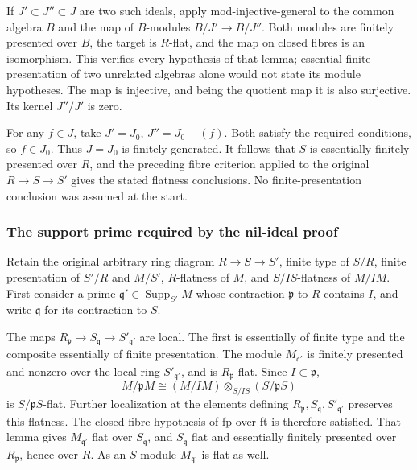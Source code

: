 If \(J'\subset J''\subset J\) are two such ideals, apply mod-injective-general to the common algebra \(B\) and the map of \(B\)-modules \(B/J'\to B/J''\). Both modules are finitely presented over \(B\), the target is \(R\)-flat, and the map on closed fibres is an isomorphism. This verifies every hypothesis of that lemma; essential finite presentation of two unrelated algebras alone would not state its module hypotheses. The map is injective, and being the quotient map it is also surjective. Its kernel \(J''/J'\) is zero.

For any \(f\in J\), take \(J'=J_0\), \(J''=J_0+(f)\). Both satisfy the required conditions, so \(f\in J_0\). Thus \(J=J_0\) is finitely generated. It follows that \(S\) is essentially finitely presented over \(R\), and the preceding fibre criterion applied to the original \(R\to S\to S'\) gives the stated flatness conclusions. No finite-presentation conclusion was assumed at the start.

\subsubsection{The support prime required by the nil-ideal proof}\label{algebra-proof-038-the-support-prime-required-by-the-nil-ideal-proof}

Retain the original arbitrary ring diagram \(R\to S\to S'\), finite type of \(S/R\), finite presentation of \(S'/R\) and \(M/S'\), \(R\)-flatness of \(M\), and \(S/IS\)-flatness of \(M/IM\). First consider a prime \(\mathfrak q'\in\operatorname{Supp}_{S'}M\) whose contraction \(\mathfrak p\) to \(R\) contains \(I\), and write \(\mathfrak q\) for its contraction to \(S\).

The maps \(R_{\mathfrak p}\to S_{\mathfrak q}\to S'_{\mathfrak q'}\) are local. The first is essentially of finite type and the composite essentially of finite presentation. The module \(M_{\mathfrak q'}\) is finitely presented and nonzero over the local ring \(S'_{\mathfrak q'}\), and is \(R_{\mathfrak p}\)-flat. Since \(I\subset\mathfrak p\), \[
M/\mathfrak pM\cong (M/IM)\otimes_{S/IS}(S/\mathfrak pS)
\] is \(S/\mathfrak pS\)-flat. Further localization at the elements defining \(R_{\mathfrak p},S_{\mathfrak q},S'_{\mathfrak q'}\) preserves this flatness. The closed-fibre hypothesis of fp-over-ft is therefore satisfied. That lemma gives \(M_{\mathfrak q'}\) flat over \(S_{\mathfrak q}\), and \(S_{\mathfrak q}\) flat and essentially finitely presented over \(R_{\mathfrak p}\), hence over \(R\). As an \(S\)-module \(M_{\mathfrak q'}\) is flat as well.

